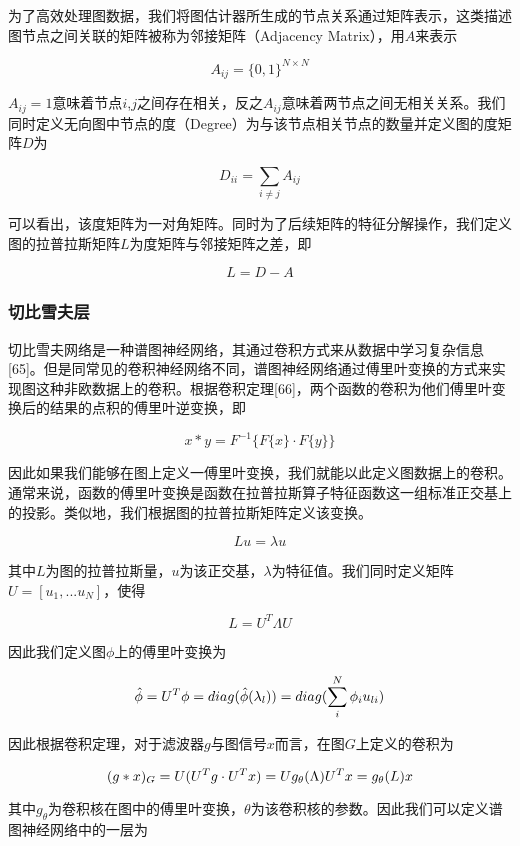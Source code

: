 \documentclass[
]{article}
\begin{document}
为了高效处理图数据，我们将图估计器所生成的节点关系通过矩阵表示，这类描述图节点之间关联的矩阵被称为邻接矩阵（Adjacency
Matrix），用\(A\)来表示

\[A_{ij}=\{0,1\}^{N\times N}\]

\(A_{ij}=1\)意味着节点\(i\),\(j\)之间存在相关，反之\(A_{ij}\)意味着两节点之间无相关关系。我们同时定义无向图中节点的度（Degree）为与该节点相关节点的数量并定义图的度矩阵\(D\)为

\[D_{ii}=\sum_{i\neq j}A_{ij}\]

可以看出，该度矩阵为一对角矩阵。同时为了后续矩阵的特征分解操作，我们定义图的拉普拉斯矩阵\(L\)为度矩阵与邻接矩阵之差，即

\[L=D-A\]

\hypertarget{ux5207ux6bd4ux96eaux592bux5c42}{%
\subsubsection{切比雪夫层}\label{ux5207ux6bd4ux96eaux592bux5c42}}

切比雪夫网络是一种谱图神经网络，其通过卷积方式来从数据中学习复杂信息{[}65{]}。但是同常见的卷积神经网络不同，谱图神经网络通过傅里叶变换的方式来实现图这种非欧数据上的卷积。根据卷积定理{[}66{]}，两个函数的卷积为他们傅里叶变换后的结果的点积的傅里叶逆变换，即

\[x * y=F^{-1}\{F\{x\}\cdot F\{y\} \}\]

因此如果我们能够在图上定义一傅里叶变换，我们就能以此定义图数据上的卷积。通常来说，函数的傅里叶变换是函数在拉普拉斯算子特征函数这一组标准正交基上的投影。类似地，我们根据图的拉普拉斯矩阵定义该变换。

\[Lu=\lambda u\]

其中\(L\)为图的拉普拉斯量，\(u\)为该正交基，\(\lambda\)为特征值。我们同时定义矩阵\(U=[u_1,...u_N]\)，使得

\[L=U^T\Lambda U\]

因此我们定义图\(\phi\)上的傅里叶变换为

\[\hat \phi =U^T\phi =diag(\hat \phi(\lambda_l))\\
=diag(\sum_i^N\phi_iu_{li})\]

因此根据卷积定理，对于滤波器\(g\)与图信号\(x\)而言，在图\(G\)上定义的卷积为

\[(g*x)_{G}=U(U^Tg\cdot U^Tx)\\
=Ug_\theta(\Lambda) U^Tx\\
=g_\theta(L)x\]

其中\(g_\theta\)为卷积核在图中的傅里叶变换，\(\theta\)为该卷积核的参数。因此我们可以定义谱图神经网络中的一层为
\end{document}
